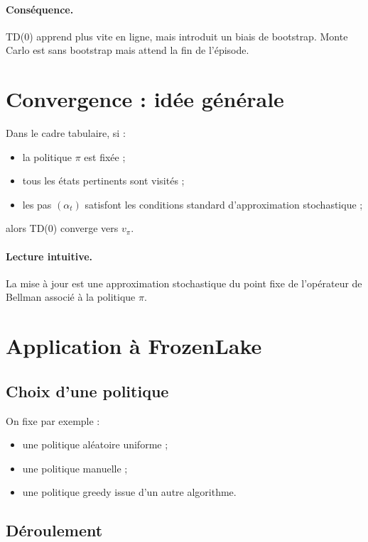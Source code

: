 \documentclass[11pt,a4paper]{article}
\begin{document}
\paragraph{Conséquence.}
TD(0) apprend plus vite en ligne, mais introduit un biais de bootstrap. Monte Carlo est sans bootstrap mais attend la fin de l'épisode.

\section{Convergence : idée générale}

Dans le cadre tabulaire, si :
\begin{itemize}[leftmargin=1.6em]
    \item la politique $\pi$ est fixée ;
    \item tous les états pertinents sont visités ;
    \item les pas $(\alpha_t)$ satisfont les conditions standard d'approximation stochastique ;
\end{itemize}
alors TD(0) converge vers $v_{\pi}$.

\paragraph{Lecture intuitive.}
La mise à jour est une approximation stochastique du point fixe de l'opérateur de Bellman associé à la politique $\pi$.

\section{Application à FrozenLake}

\subsection{Choix d'une politique}

On fixe par exemple :
\begin{itemize}[leftmargin=1.6em]
    \item une politique aléatoire uniforme ;
    \item une politique manuelle ;
    \item une politique greedy issue d'un autre algorithme.
\end{itemize}

\subsection{Déroulement}
\end{document}
